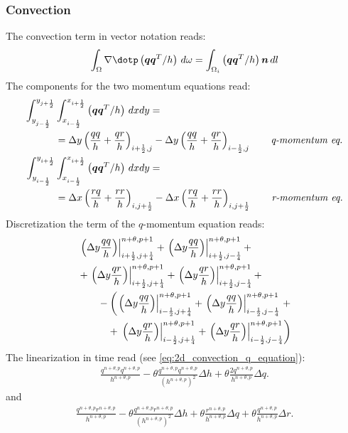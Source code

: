 \subsubsection{Convection}
The convection term in vector notation reads:
\begin{align}
    \int_\Omega \nabla \dotp \left( \vec{q}\vec{q}^T/h \right)\, d\omega =
    \int_{\Omega_i}  \left( \vec{q}\vec{q}^T/h \right) \vec{n} \, dl
\end{align}
The components for the two momentum equations read:
\begin{align}
    \int^{y_{j+\frac{1}{2}}}_{y_{j-\frac{1}{2}}}&  \int^{x_{i+\frac{1}{2}}}_{x_{i-\frac{1}{2}}} \left( \mbox{\boldmath $q$}\mbox{\boldmath $q$}^T/h \right) \, dxdy =
    \\
    & = \Delta y \left(\frac{qq}{h} + \frac{qr}{h}\right)_{i+\frac{1}{2},j} -
    \Delta y \left(\frac{qq}{h} + \frac{qr}{h}\right)_{i-\frac{1}{2},j}
    \qquad \textit{q-momentum eq.}
    \\
    \int^{y_{i+\frac{1}{2}}}_{y_{i-\frac{1}{2}}}&  \int^{x_{i+\frac{1}{2}}}_{x_{i-\frac{1}{2}}} \left( \mbox{\boldmath $q$}\mbox{\boldmath $q$}^T/h \right) \, dxdy  =
    \\
    & = \Delta x \left(\frac{rq}{h} + \frac{rr}{h}\right)_{i,j+\frac{1}{2}}  -
    \Delta x \left(\frac{rq}{h} + \frac{rr}{h}\right)_{i,j+\frac{1}{2}}
    \qquad \textit{r-momentum eq.}
\end{align}
Discretization the term of the $q$-momentum equation reads:
\begin{align}
    &
    \left. \left(\Delta y\frac{qq}{h}\right)\right|^{n+\theta,p+1}_{i+\frac{1}{2},j+\frac{1}{4}} +
    \left. \left(\Delta y\frac{qq}{h}\right)\right|^{n+\theta,p+1}_{i+\frac{1}{2},j-\frac{1}{4}} +
    \\
    &
    +\left. \left(\Delta y\frac{qr}{h}\right)\right|^{n+\theta,p+1}_{i+\frac{1}{2},j+\frac{1}{4}} +
    \left. \left(\Delta y\frac{qr}{h}\right)\right|^{n+\theta,p+1}_{i+\frac{1}{2},j-\frac{1}{4}} +
    \\
    & \qquad - \left(
    \left. \left(\Delta y\frac{qq}{h}\right)\right|^{n+\theta,p+1}_{i-\frac{1}{2},j+\frac{1}{4}} +
    \left. \left(\Delta y\frac{qq}{h}\right)\right|^{n+\theta,p+1}_{i-\frac{1}{2},j-\frac{1}{4}} \right. +
    \\
     & \qquad \quad + \left. \left. \left(\Delta y\frac{qr}{h}\right)\right|^{n+\theta,p+1}_{i-\frac{1}{2},j+\frac{1}{4}} +
    \left. \left(\Delta y\frac{qr}{h}\right)\right|^{n+\theta,p+1}_{i-\frac{1}{2},j-\frac{1}{4}}  \right)
\end{align}
The linearization in time read (see \autoref{eq:2d_convection_q_equation}):
\begin{align}
    \frac{q^{n+\theta, p}q^{n+\theta, p}}{h^{n+\theta, p}} - \theta \frac{q^{n+\theta, p}q^{n+\theta, p}}{(h^{n+\theta, p})^2} \Delta h + \theta \frac{2 q^{n+\theta, p}}{h^{n+\theta, p}} \Delta q.
\end{align}
and
\begin{align}
\frac{q^{n+\theta, p}r^{n+\theta, p}}{h^{n+\theta, p}} - \theta \frac{q^{n+\theta, p}r^{n+\theta, p}}{(h^{n+\theta, p})^2} \Delta h + \theta \frac{r^{n+\theta, p}}{h^{n+\theta, p}} \Delta q + \theta \frac{q^{n+\theta, p}}{h^{n+\theta, p}} \Delta r.
\end{align}
\notyet

